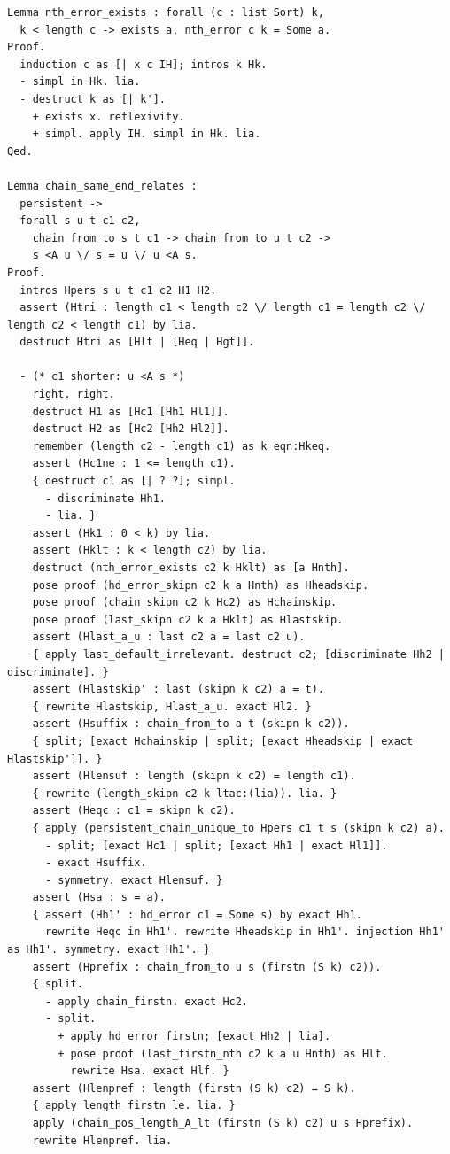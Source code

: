 \begin{latin}
\begin{verbatim}
Lemma nth_error_exists : forall (c : list Sort) k, 
  k < length c -> exists a, nth_error c k = Some a.
Proof.
  induction c as [| x c IH]; intros k Hk.
  - simpl in Hk. lia.
  - destruct k as [| k'].
    + exists x. reflexivity.
    + simpl. apply IH. simpl in Hk. lia.
Qed.

Lemma chain_same_end_relates :
  persistent ->
  forall s u t c1 c2,
    chain_from_to s t c1 -> chain_from_to u t c2 ->
    s <A u \/ s = u \/ u <A s.
Proof.
  intros Hpers s u t c1 c2 H1 H2.
  assert (Htri : length c1 < length c2 \/ length c1 = length c2 \/ length c2 < length c1) by lia.
  destruct Htri as [Hlt | [Heq | Hgt]].

  - (* c1 shorter: u <A s *)
    right. right.
    destruct H1 as [Hc1 [Hh1 Hl1]].
    destruct H2 as [Hc2 [Hh2 Hl2]].
    remember (length c2 - length c1) as k eqn:Hkeq.
    assert (Hc1ne : 1 <= length c1).
    { destruct c1 as [| ? ?]; simpl.
      - discriminate Hh1.
      - lia. }
    assert (Hk1 : 0 < k) by lia.
    assert (Hklt : k < length c2) by lia.
    destruct (nth_error_exists c2 k Hklt) as [a Hnth].
    pose proof (hd_error_skipn c2 k a Hnth) as Hheadskip.
    pose proof (chain_skipn c2 k Hc2) as Hchainskip.
    pose proof (last_skipn c2 k a Hklt) as Hlastskip.
    assert (Hlast_a_u : last c2 a = last c2 u).
    { apply last_default_irrelevant. destruct c2; [discriminate Hh2 | discriminate]. }
    assert (Hlastskip' : last (skipn k c2) a = t).
    { rewrite Hlastskip, Hlast_a_u. exact Hl2. }
    assert (Hsuffix : chain_from_to a t (skipn k c2)).
    { split; [exact Hchainskip | split; [exact Hheadskip | exact Hlastskip']]. }
    assert (Hlensuf : length (skipn k c2) = length c1).
    { rewrite (length_skipn c2 k ltac:(lia)). lia. }
    assert (Heqc : c1 = skipn k c2).
    { apply (persistent_chain_unique_to Hpers c1 t s (skipn k c2) a).
      - split; [exact Hc1 | split; [exact Hh1 | exact Hl1]].
      - exact Hsuffix.
      - symmetry. exact Hlensuf. }
    assert (Hsa : s = a).
    { assert (Hh1' : hd_error c1 = Some s) by exact Hh1.
      rewrite Heqc in Hh1'. rewrite Hheadskip in Hh1'. injection Hh1' as Hh1'. symmetry. exact Hh1'. }
    assert (Hprefix : chain_from_to u s (firstn (S k) c2)).
    { split.
      - apply chain_firstn. exact Hc2.
      - split.
        + apply hd_error_firstn; [exact Hh2 | lia].
        + pose proof (last_firstn_nth c2 k a u Hnth) as Hlf.
          rewrite Hsa. exact Hlf. }
    assert (Hlenpref : length (firstn (S k) c2) = S k).
    { apply length_firstn_le. lia. }
    apply (chain_pos_length_A_lt (firstn (S k) c2) u s Hprefix).
    rewrite Hlenpref. lia.


\end{verbatim}
\end{latin}
